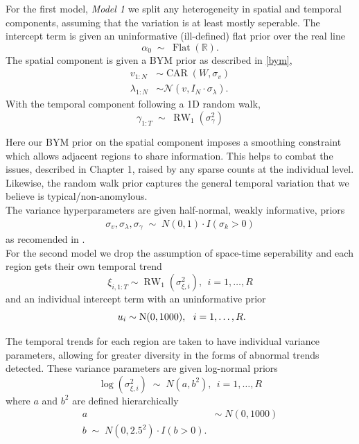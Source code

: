 \documentclass[11pt]{report}
\begin{document}
For the first model, \emph{Model 1} we split any heterogeneity in spatial and temporal components, assuming that the variation is at least mostly seperable. The intercept term is given an uninformative (ill-defined) flat prior over the real line
\begin{equation} \label{eq:intercept}
\alpha_0 \;\sim\; \operatorname{Flat}(\mathbb{R}).
\end{equation}
The spatial component is given a BYM prior as described in \ref{bym},
\begin{align}
v_{1:N} &\sim \operatorname{CAR}(W, \sigma_v) \\
\lambda_{1:N} &\sim \mathcal{N}(v, I_N \cdot \sigma_\lambda).
\end{align}
With the temporal component following a 1D random walk,
\begin{equation*}
\gamma_{1:T} \;\sim\; \operatorname{RW}_1(\sigma_\gamma^2)
\end{equation*}

Here our BYM prior on the spatial component imposes a smoothing constraint which allows adjacent regions to share information. This helps to combat the issues, described in Chapter 1, raised by any sparse counts at the individual level. Likewise, the random walk prior captures the general temporal variation that we believe is typical/non-anomylous. \\

The variance hyperparameters are given half-normal, weakly informative, priors
\begin{gather}
\sigma_v, \sigma_\lambda, \sigma_\gamma \; \sim \; N(0, 1) \cdot I(\sigma_k > 0)
\end{gather}
as recomended in \citet{gelman2006prior}. \\

For the second model we drop the assumption of space-time seperability and each region gets their own temporal trend
\begin{equation*}
\xi_{i, 1:T} \sim \operatorname{RW}_1(\sigma_{\xi, i}^2), \ \ i=1,\ldots, R 
\end{equation*}
and an individual intercept term with an uninformative prior
\begin{equation*}
\ u_i \sim \operatorname{N}(0, 1000), \ \  i=1,\ldots, R. \\
\end{equation*}

The temporal trends for each region are taken to have individual variance parameters, allowing for greater diversity in the forms of abnormal trends detected. These variance parameters are given log-normal priors
\begin{equation*}
\log(\sigma_{\xi, i}^2) \; \sim \; N(a, b^2), \ \ i=1,\ldots,R
\end{equation*}
where $a$ and $b^2$ are defined hierarchically
\begin{align*}
a \; &\sim \; N(0, 1000) \\
b \; \sim \; N(0, 2.5^2) \cdot I(b > 0).
\end{align*}
\end{document}
